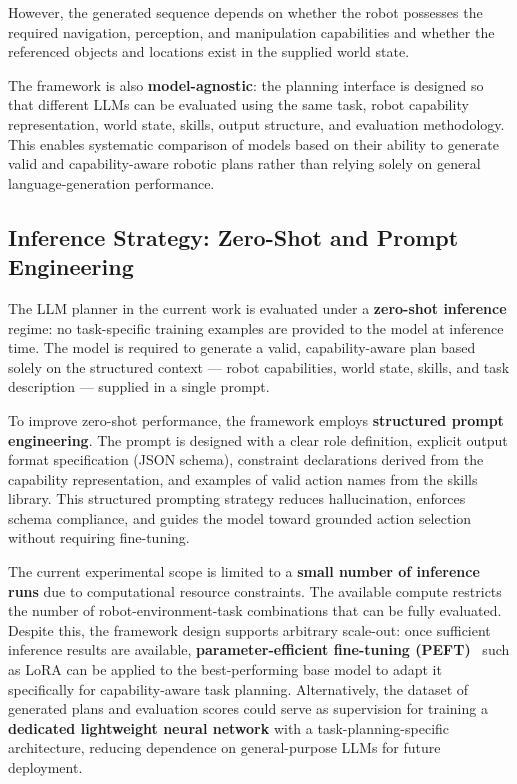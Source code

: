 \documentclass[12pt,a4paper]{article}
\begin{document}
However, the generated sequence depends on whether the robot possesses the required navigation, perception, and manipulation capabilities and whether the referenced objects and locations exist in the supplied world state.

The framework is also \textbf{model-agnostic}: the planning interface is designed so that different LLMs can be evaluated using the same task, robot capability representation, world state, skills, output structure, and evaluation methodology.
This enables systematic comparison of models based on their ability to generate valid and capability-aware robotic plans rather than relying solely on general language-generation performance.

\subsection{Inference Strategy: Zero-Shot and Prompt Engineering}

The LLM planner in the current work is evaluated under a \textbf{zero-shot inference} regime: no task-specific training examples are provided to the model at inference time.
The model is required to generate a valid, capability-aware plan based solely on the structured context --- robot capabilities, world state, skills, and task description --- supplied in a single prompt.

To improve zero-shot performance, the framework employs \textbf{structured prompt engineering}.
The prompt is designed with a clear role definition, explicit output format specification (JSON schema), constraint declarations derived from the capability representation, and examples of valid action names from the skills library.
This structured prompting strategy reduces hallucination, enforces schema compliance, and guides the model toward grounded action selection without requiring fine-tuning.

The current experimental scope is limited to a \textbf{small number of inference runs} due to computational resource constraints.
The available compute restricts the number of robot-environment-task combinations that can be fully evaluated.
Despite this, the framework design supports arbitrary scale-out: once sufficient inference results are available, \textbf{parameter-efficient fine-tuning (PEFT)}~\cite{peft} such as LoRA can be applied to the best-performing base model to adapt it specifically for capability-aware task planning.
Alternatively, the dataset of generated plans and evaluation scores could serve as supervision for training a \textbf{dedicated lightweight neural network} with a task-planning-specific architecture, reducing dependence on general-purpose LLMs for future deployment.
\end{document}
